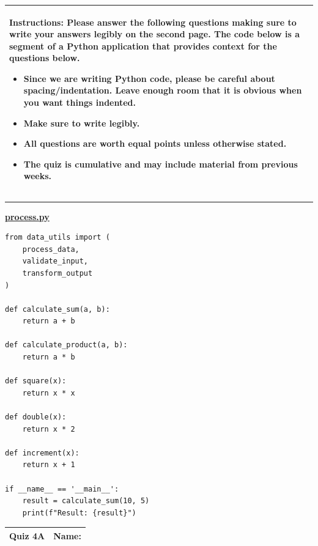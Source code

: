 \documentclass[11pt]{article}
\begin{document}
\begin{table}[h]
\centering
{} %
\begin{tabular}{|p{\textwidth}|}
\hline
\begin{minipage}[t]{\textwidth}
\vspace{0pt}  %
\noindent \textbf{Instructions:} Please answer the following questions making sure to write your answers legibly on the second page. The code below is a segment of a Python application that provides context for the questions below.
\begin{itemize}
\item Since we are writing Python code, please be careful about spacing/indentation. Leave enough room that it is obvious when you want things indented. 
\item Make sure to write legibly.
\item All questions are worth equal points unless otherwise stated.
\item The quiz is cumulative and may include material from previous weeks.
\end{itemize}
\end{minipage} 
\\
\hline
\end{tabular}
\end{table}

{\color{lightgray}\hrule}
\vspace{1cm}
\underline{\textbf{process.py}}
\begin{verbatim}
from data_utils import (
    process_data,
    validate_input,
    transform_output
)

def calculate_sum(a, b):
    return a + b

def calculate_product(a, b):
    return a * b

def square(x):
    return x * x

def double(x):
    return x * 2

def increment(x):
    return x + 1

if __name__ == '__main__':
    result = calculate_sum(10, 5)
    print(f"Result: {result}")
\end{verbatim}


\clearpage

\begin{tabularx}{\textwidth}{l|X}
\textbf{Quiz 4A} &   \textbf{Name: } \\
\hline
\end{tabularx}
\end{document}
